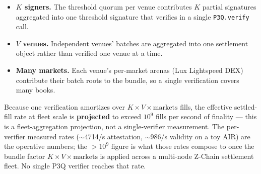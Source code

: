 \begin{itemize}[leftmargin=2em,nosep]
  \item \textbf{$K$ signers.} The threshold quorum per venue contributes
    $K$ partial signatures aggregated into one threshold signature that
    verifies in a single \texttt{P3Q.verify} call.
  \item \textbf{$V$ venues.} Independent venues' batches are aggregated
    into one settlement object rather than verified one venue at a time.
  \item \textbf{Many markets.} Each venue's per-market arenas (Lux
    Lightspeed DEX) contribute their batch roots to the bundle, so a
    single verification covers many books.
\end{itemize}

Because one verification amortizes over $K \times V \times
\text{markets}$ fills, the effective settled-fill rate at fleet scale is
\textbf{projected} to exceed $10^9$ fills per second of finality ---
this is a fleet-aggregation projection, not a single-verifier
measurement. The per-verifier measured rates ($\sim$\num{4714}/s
attestation, $\sim$\num{986}/s validity on a toy AIR) are the operative
numbers; the $>$$10^9$ figure is what those rates compose to once the
bundle factor $K \times V \times \text{markets}$ is applied across a
multi-node Z-Chain settlement fleet. No single P3Q verifier reaches that
rate.

